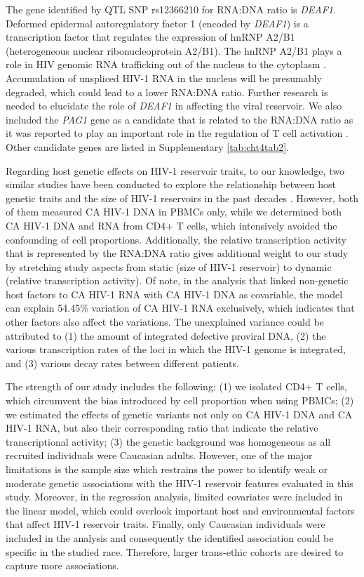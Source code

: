 \documentclass{book}
\begin{document}
\begin{refsection}
The gene identified by QTL SNP rs12366210 for RNA:DNA ratio is \textit{DEAF1}.
Deformed epidermal autoregulatory factor 1 (encoded by \textit{DEAF1}) is a transcription factor that regulates the expression of hnRNP A2/B1 (heterogeneous nuclear ribonucleoprotein A2/B1).
The hnRNP A2/B1 plays a role in HIV genomic RNA trafficking out of the nucleus to the cytoplasm \cite{Lévesque2006Trafficking}.
Accumulation of unspliced HIV-1 RNA in the nucleus will be presumably degraded, which could lead to a lower RNA:DNA ratio.
Further research is needed to elucidate the role of \textit{DEAF1} in affecting the viral reservoir.
We also included the \textit{PAG1} gene as a candidate that is related to the RNA:DNA ratio as it was reported to play an important role in the regulation of T cell activation \cite{Franck2015Phosphoproteome}.
Other candidate genes are listed in Supplementary \ref{tab:cht4tab2}.

Regarding host genetic effects on HIV-1 reservoir traits, to our knowledge, two similar studies have been conducted to explore the relationship between host genetic traits and the size of HIV-1 reservoirs in the past decades \cite{Thorball2020Host,Dalmasso2008Distinct}.
However, both of them measured CA HIV-1 DNA in PBMCs only, while we determined both CA HIV-1 DNA and RNA from CD4+ T cells, which intensively avoided the confounding of cell proportions.
Additionally, the relative transcription activity that is represented by the RNA:DNA ratio gives additional weight to our study by stretching study aspects from static (size of HIV-1 reservoir) to dynamic (relative transcription activity).
Of note, in the analysis that linked non-genetic host factors to CA HIV-1 RNA with CA HIV-1 DNA as covariable, the model can explain 54.45\% variation of CA HIV-1 RNA exclusively, which indicates that other factors also affect the variations.
The unexplained variance could be attributed to (1) the amount of integrated defective proviral DNA, (2) the various transcription rates of the loci in which the HIV-1 genome is integrated, and (3) various decay rates between different patients.

The strength of our study includes the following: (1) we isolated CD4+ T cells, which circumvent the bias introduced by cell proportion when using PBMCs; (2) we estimated the effects of genetic variants not only on CA HIV-1 DNA and CA HIV-1 RNA, but also their corresponding ratio that indicate the relative transcriptional activity; (3) the genetic background was homogeneous as all recruited individuals were Caucasian adults.
However, one of the major limitations is the sample size which restrains the power to identify weak or moderate genetic associations with the HIV-1 reservoir features evaluated in this study.
Moreover, in the regression analysis, limited covariates were included in the linear model, which could overlook important host and environmental factors that affect HIV-1 reservoir traits.
Finally, only Caucasian individuals were included in the analysis and consequently the identified association could be specific in the studied race.
Therefore, larger trans-ethic cohorts are desired to capture more associations.


\end{refsection}
\end{document}
